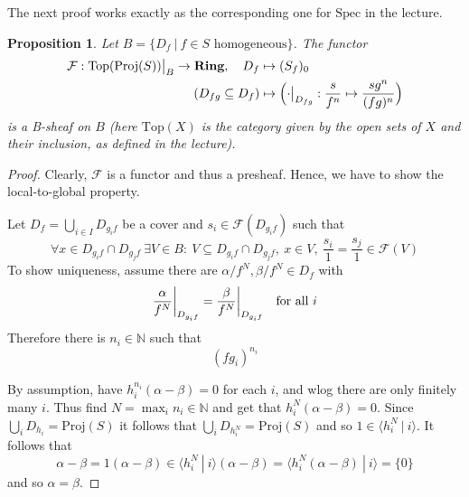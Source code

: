 \documentclass{scrartcl}
\newcommand{\N}{\mathbb{N}}
\newcommand{\Ring}{\mathrm{\textbf{Ring}}}
\newcommand{\Top}{\mathrm{Top}}
\newcommand{\Spec}{\mathrm{Spec}}
\newcommand{\Proj}{\mathrm{Proj}}
\newcommand\restr[2]{{
    \left.\kern-\nulldelimiterspace
    #1
    \vphantom{\big|}
    \right|_{#2}
}}
\newtheorem{prop}{Proposition}
\theoremstyle{definition}
\begin{document}
The next proof works exactly as the corresponding one for $\Spec$ in the lecture.
\begin{prop}
    Let $B = \{ D_f \ | \ \text{$f \in S$ homogeneous}\}$.
    The functor
    \begin{align*}
        \mathcal{F}: \restr{\Top(\Proj(S))}{B} \to \Ring, \quad D_f &\mapsto (S_f)_0 \\
        (D_{fg} \subseteq D_f) &\mapsto \Bigl( \restr{\cdot}{D_{fg}}: \frac s {f^n} \mapsto \frac {sg^n} {(fg)^n} \Bigr)
    \end{align*}
    is a B-sheaf on $B$ (here $\Top(X)$ is the category given by the open sets of $X$ and their inclusion, as defined in the lecture).
\end{prop}
\begin{proof}
    Clearly, $\mathcal{F}$ is a functor and thus a presheaf.
    Hence, we have to show the local-to-global property.

    Let $D_f = \bigcup_{i \in I} D_{g_if}$ be a cover and $s_i \in \mathcal{F}(D_{g_if})$ such that
    \begin{equation*}
        \forall x \in D_{g_if} \cap D_{g_jf} \ \exists V \in B: \ V \subseteq D_{g_if} \cap D_{g_jf}, \ x \in V, \ \frac {s_i} 1 = \frac {s_j} 1 \in \mathcal{F}(V)
    \end{equation*}
    To show uniqueness, assume there are $\alpha/f^N, \beta/f^N \in D_f$ with
    \begin{equation*}
        \restr{\frac {\alpha} {f^N}}{D_{g_if}} = \restr{\frac {\beta} {f^N}}{D_{g_if}} \quad \text{for all $i$}
    \end{equation*}
    Therefore there is $n_i \in \N$ such that
    \begin{equation*}
        (fg_i)^{n_i}
    \end{equation*}


    By assumption, have $h_i^{n_i}(\alpha - \beta) = 0$ for each $i$, and wlog there are only finitely many $i$.
    Thus find $N = \max_i n_i \in \N$ and get that $h_i^N(\alpha - \beta) = 0$.
    Since $\bigcup_i D_{h_i} = \Proj(S)$ it follows that $\bigcup_i D_{h_i^N} = \Proj(S)$ and so $1 \in \langle h_i^N \ | \ i \rangle$.
    It follows that
    \begin{equation*}
        \alpha - \beta = 1(\alpha - \beta) \in \langle h_i^N \ | \ i \rangle (\alpha - \beta) = \langle h_i^N (\alpha - \beta) \ | \ i \rangle = \{ 0 \}
    \end{equation*}
    and so $\alpha = \beta$.


\end{proof}
\end{document}
